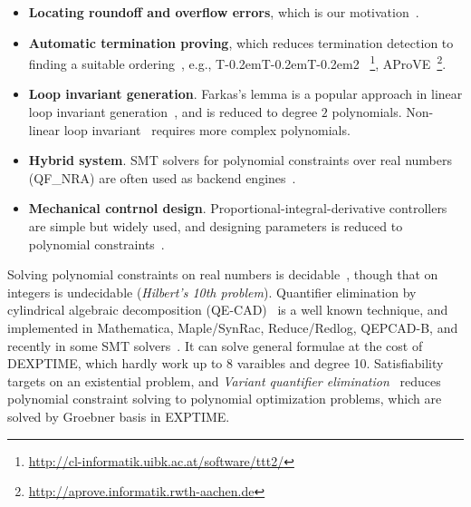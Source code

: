 \documentclass[runningheads,a4paper,oribibl]{llncs}
\newcommand\TTTT{%
 \textsf{T\kern-0.2em\raisebox{-0.3em}T\kern-0.2emT\kern-0.2em\raisebox{-0.3em}2}%
}
\begin{document}
\begin{itemize}
\item {\bf Locating roundoff and overflow errors}, 
which is our motivation~\cite{Ngoc:2009:ORE:1685167.1685421,Ngoc:2010:CRE:1858996.1859056}. 

\item {\bf Automatic termination proving}, 
which reduces termination detection to finding a suitable ordering~\cite{Lucas:2008:CCS:1361735.1361760}, 
e.g., \TTTT~\footnote{\url{http://cl-informatik.uibk.ac.at/software/ttt2/}}, 
AProVE~\footnote{\url{http://aprove.informatik.rwth-aachen.de}}. 

\item {\bf Loop invariant generation}. 
Farkas's lemma is a popular approach in linear loop invariant generation~\cite{Colon}, 
and is reduced to degree $2$ polynomials. 
Non-linear loop invariant~\cite{Sankaranarayanan:2004:NLI:982962.964028} requires more complex polynomials.

\item {\bf Hybrid system}. SMT solvers for polynomial constraints over real numbers (QF\_NRA) are often used as backend engines~\cite{Sankaranarayanan04constructinginvariants}. 

\item {\bf Mechanical contrnol design}. 
Proportional-integral-derivative controllers are simple but widely used, and designing parameters is 
reduced to polynomial constraints~\cite{control}. 
\end{itemize}	

Solving polynomial constraints on real numbers is decidable~\cite{tarski}, 
though that on integers is undecidable ({\em Hilbert's 10th problem}). 
Quantifier elimination by cylindrical algebraic decomposition (QE-CAD)~\cite{qecad} 
is a well known technique, and 
implemented in Mathematica, Maple/SynRac, Reduce/Redlog, QEPCAD-B, and recently 
in some SMT solvers~\cite{Jovanovic13}. 
It can solve general formulae at the cost of DEXPTIME, which hardly work up to 8 varaibles and degree 10.
Satisfiability targets on an existential problem, and 
{\em Variant quantifier elimination}~\cite{Hong2012883} reduces polynomial constraint solving to 
polynomial optimization problems, which are solved by Groebner basis in EXPTIME. 
\end{document}
